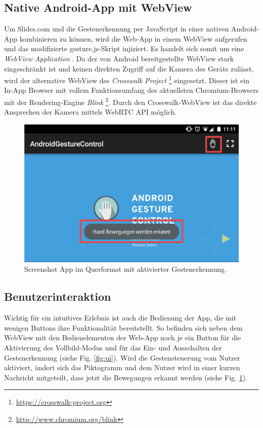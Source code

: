 \documentclass{article}
\begin{document}
\subsection{Native Android-App mit WebView}
Um Slides.com und die Gestenerkennung per JavaScript in einer nativen Android-App kombinieren zu können, wird die Web-App in einem WebView aufgerufen und das modifizierte gesture.js-Skript injiziert. Es handelt sich somit um eine \textit{WebView Application} \cite{webview14}. Da der von Android  bereitgestellte WebView stark eingeschränkt ist und keinen direkten Zugriff auf die Kamera des Geräts zulässt, wird der alternative WebView des \textit{Crosswalk Project} \footnote{\url{https://crosswalk-project.org}} eingesetzt. Dieser ist ein In-App Browser mit vollem Funktionsumfang des aktuellsten Chromium-Browsers mit der Rendering-Engine \textit{Blink} \footnote{\url{http://www.chromium.org/blink}}. Durch den Crosswalk-WebView ist das direkte Ansprechen der Kamera mittels WebRTC API möglich.

\begin{figure}[htb]
\begin{minipage}[b]{1.0\linewidth}
  \centering
\centerline{\includegraphics[width=1\linewidth]{screenshot-ui-toast-quer.png}}
\end{minipage}
\caption{Screenshot App im Querformat mit aktivierter Gestenerkennung.}
\label{fig:toast}
\end{figure}

\subsection{Benutzerinteraktion}
Wichtig für ein intuitives Erlebnis ist auch die Bedienung der App, die mit wenigen Buttons ihre Funktionalität bereitstellt.
So befinden sich neben dem WebView mit den Bedienelementen der Web-App noch je ein Button für die Aktivierung des Vollbild-Modus und für das Ein- und Ausschalten der Gestenerkennung (siehe Fig. \ref{fig:ui}).
Wird die Gestensteuerung vom Nutzer aktiviert, ändert sich das Piktogramm und dem Nutzer wird in einer kurzen Nachricht mitgeteilt, dass jetzt die Bewegungen erkannt werden (siehe Fig. \ref{fig:toast}).
\end{document}
